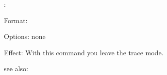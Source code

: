 \nospy:

Format: 

Options: none

Effect: With this \FORWARD{} command you leave the trace mode.

see also: \spy
